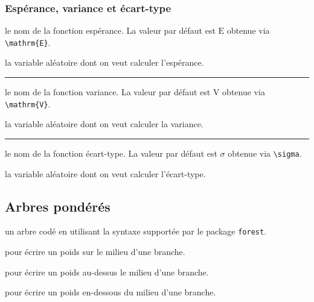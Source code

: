 \documentclass[12pt,a4paper]{article}
\theoremstyle{definition}
\newcommand\separation{
	\medskip
	\hfill\rule{0.5\textwidth}{0.75pt}\hfill
	\medskip
}
\newcommand\extraspace{
	\vspace{0.25em}
}
\begin{document}
\subsubsection{Espérance, variance et écart-type}




\IDoption{} le nom de la fonction espérance. La valeur par défaut est $\mathrm{E}$ obtenue via \verb#\mathrm{E}#.

\IDarg{} la variable aléatoire dont on veut calculer l'espérance.


\separation



\IDoption{} le nom de la fonction variance. La valeur par défaut est $\mathrm{V}$ obtenue via \verb#\mathrm{V}#.

\IDarg{} la variable aléatoire dont on veut calculer la variance.


\separation



\IDoption{} le nom de la fonction écart-type. La valeur par défaut est $\sigma$ obtenue via \verb#\sigma#.

\IDarg{} la variable aléatoire dont on veut calculer l'écart-type.




















\subsection{Arbres pondérés}





\Content{} un arbre codé en utilisant la syntaxe supportée par le package \verb+forest+.

\extraspace

  pour écrire un poids sur le milieu d'une branche.

 pour écrire un poids au-dessus le milieu d'une branche.

 pour écrire un poids en-dessous du milieu d'une branche.
\end{document}
